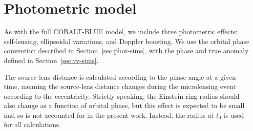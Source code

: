 \documentclass[fleqn,usenatbib]{mnras}
\begin{document}


\appendix

\section{Photometric model} \label{sec:phot-model}
As with the full COBALT-BLUE model, we include three photometric effects: self-lensing, ellipsoidal variations, and Doppler boosting. We use the orbital phase convention described in Section~\ref{sec:phot-sims}, with the phase and true anomaly defined in Section~\ref{sec:rv-sims}.

The source-lens distance is calculated according to the phase angle at a given time, meaning the source-lens distance changes during the microlensing event according to the eccentricity. Strictly speaking, the Einstein ring radius should also change as a function of orbital phase, but this effect is expected to be small and so is not accounted for in the present work. Instead, the radius at $t_0$ is used for all calculations.
\end{document}
